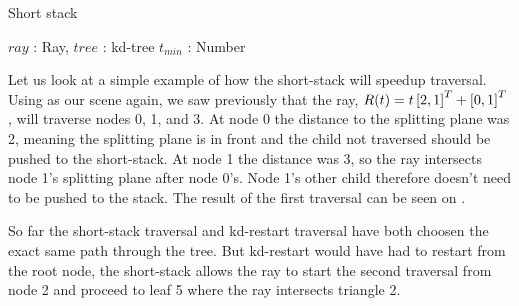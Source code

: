 \begin{algorithm}
  \caption{Short stack}
  \label{alg:ShortStack}
  \begin{algorithmic}
              {$ray$ : Ray, $tree$ : kd-tree}
              {$t_{min}$ : Number}{
      \ELSE
      \ENDIF
          \ENDIF
        \ELSE
        \ENDIF
      \ENDWHILE
      \ENDFOR
      \ENDIF
    \ENDWHILE
              }
  \end{algorithmic}
\end{algorithm}


Let us look at a simple example of how the short-stack will speedup
traversal. Using  as our scene again, we
saw previously that the ray, $R(t) = t \left[2, 1 \right]^T +
\left[0, 1 \right]^T$, will traverse nodes 0, 1, and 3. At node 0 the
distance to the splitting plane was 2, meaning the splitting plane is
in front and the child not traversed should be pushed to the
short-stack. At node 1 the distance was 3, so the ray intersects node
1's splitting plane after node 0's. Node 1's other child therefore
doesn't need to be pushed to the stack. The result of the first
traversal can be seen on .

So far the short-stack traversal and kd-restart traversal have both
choosen the exact same path through the tree. But kd-restart would
have had to restart from the root node, the short-stack allows the ray
to start the second traversal from node 2 and proceed to leaf 5 where
the ray intersects triangle 2. 

